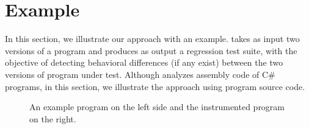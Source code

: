 \section{Example}
\label{sec:example}
In this section, we illustrate our  approach with an example.  takes as input two versions of a program and produces as output a regression test suite, with the objective of detecting behavioral differences (if any exist) between the two versions of program under test. Although  analyzes assembly code of C\# programs, in this section, we illustrate the  approach using program source code. 

    \begin{figure}[t]
    \centering
         
    \vspace{-0.6cm}
    \caption{\scriptsize{An example program on the left side and the instrumented program on the right.}}
    \label{fig:example}
     \vspace{-0.7cm}
    \end{figure}
    

